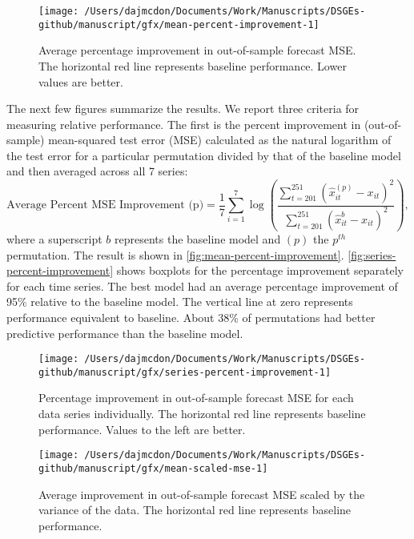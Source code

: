 \documentclass[11pt]{article}
\renewcommand{\hat}{\widehat}
\begin{document}
\begin{figure}[t]

{\centering \texttt{[image: /Users/dajmcdon/Documents/Work/Manuscripts/DSGEs-github/manuscript/gfx/mean-percent-improvement-1]} 

}

\caption{Average percentage improvement in out-of-sample forecast MSE. The horizontal red line represents baseline performance. Lower values are better.}\label{fig:mean-percent-improvement}
\end{figure}

The next few figures summarize the results. We report three criteria for
measuring relative performance. The first is the percent improvement in
(out-of-sample) mean-squared test error (MSE) calculated as the natural
logarithm of the test error for a particular permutation divided by that
of the baseline model and then averaged across all 7 series:
\begin{equation}
  \mbox{Average Percent MSE Improvement (p)} = \frac{1}{7} \sum_{i=1}^7 \log
  \left(\frac{\sum_{t=201}^{251} (\hat{x}_{it}^{(p)}-x_{it})^2}
    {\sum_{t=201}^{251} (\hat{x}_{it}^{b}-x_{it})^2}\right),
\end{equation} where a superscript \(b\) represents the baseline model
and \((p)\) the \(p^{th}\) permutation. The result is shown in
\autoref{fig:mean-percent-improvement}.
\autoref{fig:series-percent-improvement} shows boxplots for the
percentage improvement separately for each time series. The best model
had an average percentage improvement of 95\% relative to the baseline
model. The vertical line at zero represents performance equivalent to
baseline. About 38\% of permutations had better predictive performance
than the baseline model.

\begin{figure}[t]

{\centering \texttt{[image: /Users/dajmcdon/Documents/Work/Manuscripts/DSGEs-github/manuscript/gfx/series-percent-improvement-1]} 

}

\caption{Percentage improvement in out-of-sample forecast MSE for each data series individually. The horizontal red line represents baseline performance. Values to the left are better.}\label{fig:series-percent-improvement}
\end{figure}

\begin{figure}[t]

{\centering \texttt{[image: /Users/dajmcdon/Documents/Work/Manuscripts/DSGEs-github/manuscript/gfx/mean-scaled-mse-1]} 

}

\caption{Average improvement in out-of-sample forecast MSE scaled by the variance of the data. The horizontal red line represents baseline performance.}\label{fig:mean-scaled-mse}
\end{figure}
\end{document}
